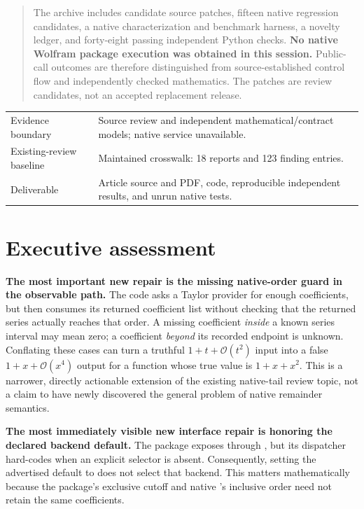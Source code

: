 \documentclass[11pt,letterpaper]{article}
\newcommand{\code}[1]{\texttt{\detokenize{#1}}}
\newcommand{\OO}{\mathcal O}
\begin{document}
\begin{titlepage}
\begin{abstract}
The archive includes candidate source patches, fifteen native regression candidates, a native characterization and benchmark harness, a novelty ledger, and forty-eight passing independent Python checks. \textbf{No native Wolfram package execution was obtained in this session.} Public-call outcomes are therefore distinguished from source-established control flow and independently checked mathematics. The patches are review candidates, not an accepted replacement release.
\end{abstract}
\vfill
\begin{tabularx}{\textwidth}{@{}P{1.6in}X@{}}
\toprule
Evidence boundary & Source review and independent mathematical/contract models; native service unavailable.\\
Existing-review baseline & Maintained crosswalk: 18 reports and 123 finding entries.\\
Deliverable & Article source and PDF, code, reproducible independent results, and unrun native tests.\\
\bottomrule
\end{tabularx}
\end{titlepage}
\tableofcontents
\newpage

\section{Executive assessment}

\textbf{The most important new repair is the missing native-order guard in the observable path.} The code asks a Taylor provider for enough coefficients, but then consumes its returned coefficient list without checking that the returned series actually reaches that order. A missing coefficient \emph{inside} a known series interval may mean zero; a coefficient \emph{beyond} its recorded endpoint is unknown. Conflating these cases can turn a truthful $1+t+\OO(t^2)$ input into a false $1+x+\OO(x^4)$ output for a function whose true value is $1+x+x^2$. This is a narrower, directly actionable extension of the existing native-tail review topic, not a claim to have newly discovered the general problem of native remainder semantics.

\textbf{The most immediately visible new interface repair is honoring the declared backend default.} The package exposes \code{"Backend"} through \code{Options}, but its dispatcher hard-codes \code{Automatic} when an explicit selector is absent. Consequently, setting the advertised default to \code{"Series"} does not select that backend. This matters mathematically because the package's exclusive cutoff and native \code{Series}'s inclusive order need not retain the same coefficients.
\end{document}
